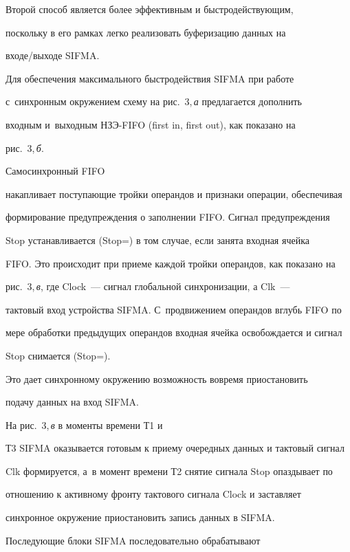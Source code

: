       Второй способ является более эффективным и быстродействующим,

поскольку в его рамках легко реализовать буферизацию данных на

      вхо\-де/вы\-хо\-де SIFMA.



      Для обеспечения максимального быстродействия SIFMA при работе

      с~синхронным окружением схему на рис.~3,\,\textit{а} предлагается дополнить

входным и~выходным НЗЭ-FIFO (first in, first out), как показано на

рис.~3,\,\textit{б}.

      Са\-мосинхронный FIFO

накапливает поступающие тройки операндов и признаки операции, обеспечивая

формирование предупреждения о заполнении FIFO. Сигнал предупреж\-де\-ния

Stop устанавливается (Stop\;=) в том случае, если занята входная ячейка

FIFO. Это происходит при приеме каждой тройки операндов, как показано на

рис.~3,\,\textit{в}, где Clock~--- сигнал глобальной синхронизации, а Clk~---

тактовый вход устройства SIFMA. С~продвижением операндов вглубь FIFO по

мере обработки предыдущих операндов входная ячейка освобождается и сигнал

Stop снимается (Stop\;=).

%

      Это дает синхронному окружению возможность вовремя приостановить

подачу данных на вход SIFMA.



На рис.~3,\,\textit{в} в моменты времени Т1 и

Т3 SIFMA оказывается готовым к приему очередных данных и тактовый сигнал

Clk формируется, а~в момент времени Т2 снятие сигнала Stop опаздывает по

отношению к активному фронту тактового сигнала Clock и заставляет

синхронное окружение приостановить запись данных в SIFMA.





      Последующие блоки SIFMA последовательно обрабатывают


